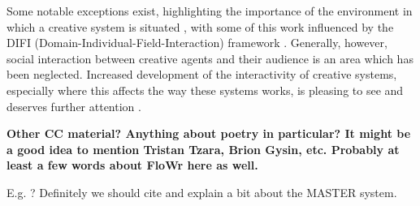 Some notable exceptions exist, highlighting the importance of the
environment in which a creative system is situated \cite{mcgraw93,
  sosa09, perezyperez10MM, pease10, saunders12}, with some of this
work influenced by the DIFI (Domain-Individual-Field-Interaction)
framework \cite{csik88}. Generally, however, social interaction
between creative agents and their audience is an area which has been
neglected. Increased development of the interactivity of creative
systems, especially where this affects the way these systems works, is
pleasing to see and deserves further attention
\cite{coltonwiggins12}.

\begin{mdframed}
\textbf{Other CC material?  Anything about poetry in particular?  It
  might be a good idea to mention Tristan Tzara, Brion Gysin, etc.
  Probably at least a few words about FloWr here as well.}

 E.g. \cite{jordanous10}?  Definitely we should cite
\cite{misztal2014poetry} and explain a bit about the MASTER system.
\end{mdframed}

